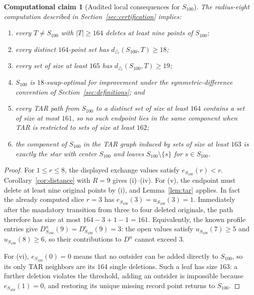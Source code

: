 \documentclass[11pt]{article}
\newtheorem{computationalclaim}[theorem]{Computational claim}
\theoremstyle{definition}
\theoremstyle{remark}
\newcommand{\dist}{d_{\triangle}}
\begin{document}
\begin{computationalclaim}[Audited local consequences for $S_{100}$]
\label{claim:n100}
The radius-eight computation described in Section~\ref{sec:certification}
implies:
\begin{enumerate}[label=(\roman*),leftmargin=*]
  \item every $T\ne S_{100}$ with $|T|\ge164$ deletes at least nine points of
  $S_{100}$;
  \item every distinct $164$-point set has
  $\dist(S_{100},T)\ge18$;
  \item every set of size at least $165$ has
  $\dist(S_{100},T)\ge19$;
  \item $S_{100}$ is $18$-swap-optimal for improvement under the
  symmetric-difference convention of Section~\ref{sec:definitions}; and
  \item every TAR path from $S_{100}$ to a distinct set of size at least $164$
  contains a set of size at most $161$, so no such endpoint lies in the same
  component when TAR is restricted to sets of size at least $162$;
  \item the component of $S_{100}$ in the TAR graph induced by sets of size at
  least $163$ is exactly the star with center $S_{100}$ and leaves
  $S_{100}\setminus\{s\}$ for $s\in S_{100}$.
\end{enumerate}
\end{computationalclaim}

\begin{proof}
For $1\le r\le8$, the displayed exchange values satisfy
$e_{S_{100}}(r)<r$.  Corollary~\ref{cor:distance} with $R=9$ gives (i)--(iv).
For (v), the endpoint must delete at least nine original points by (i), and
Lemma~\ref{lem:tar} applies.  In fact the already computed slice $r=3$ has
$e_{S_{100}}(3)=u_{S_{100}}(3)=1$.  Immediately after the mandatory
transition from three to four deleted originals, the path therefore has size
at most $164-3+1-1=161$.  Equivalently, the known profile entries give
$D^u_{S_{100}}(9)=D^e_{S_{100}}(9)=3$: the open values satisfy
$u_{S_{100}}(7)\ge5$ and $u_{S_{100}}(8)\ge6$, so their contributions to
$D^u$ cannot exceed $3$.

For (vi), $e_{S_{100}}(0)=0$ means that no outsider can be added directly to
$S_{100}$, so its only TAR neighbors are its $164$ single deletions.  Such a
leaf has size $163$: a further deletion violates the threshold, adding an
outsider is impossible because $e_{S_{100}}(1)=0$, and restoring its unique
missing record point returns to $S_{100}$.
\end{proof}
\end{document}
